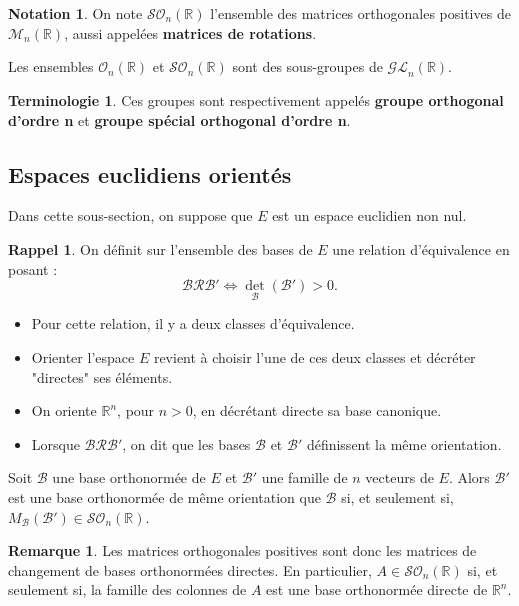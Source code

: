 \documentclass[french]{article}
\newcommand{\R}{\mathbb{R}}
\theoremstyle{plain}
\theoremstyle{definition}
\newtheorem*{rmq}{Remarque}
\newtheorem*{notation}{Notation}
\newtheorem*{rappel}{Rappel}
\newtheorem*{terminologie}{Terminologie}
\theoremstyle{remark}
\begin{document}
\begin{notation}
	On note $\mathcal{SO}_n(\R)$ l'ensemble des matrices orthogonales positives de $\mathcal{M}_n(\R)$, aussi appelées \textbf{matrices de rotations}.
\end{notation}

\begin{prop}
	Les ensembles $\mathcal{O}_n(\R)$ et $\mathcal{SO}_n(\R)$ sont des sous-groupes de $\mathcal{GL}_n(\R)$.
\end{prop}

\begin{terminologie}
	Ces groupes sont respectivement appelés \textbf{groupe orthogonal d'ordre n} et \textbf{groupe spécial orthogonal d'ordre n}.
\end{terminologie}

\subsection{Espaces euclidiens orientés}

Dans cette sous-section, on suppose que $E$ est un espace euclidien non nul.

\begin{rappel}
	On définit sur l'ensemble des bases de $E$ une relation d'équivalence en posant :
$$\mathcal{B}\mathcal{R}\mathcal{B}'\iff \det_\mathcal{B}(\mathcal{B}')>0.$$
\begin{itemize}
	\item Pour cette relation, il y a deux classes d'équivalence.
	\item Orienter l'espace $E$ revient à choisir l'une de ces deux classes et décréter "directes" ses éléments.
	\item On oriente $\R^n$, pour $n>0$, en décrétant directe sa base canonique.
	\item Lorsque $\mathcal{B}\mathcal{R}\mathcal{B}'$, on dit que les bases $\mathcal{B}$ et $\mathcal{B}'$ définissent la même orientation.
\end{itemize}
\end{rappel}

\begin{prop}
	Soit $\mathcal{B}$ une base orthonormée de $E$ et $\mathcal{B}'$ une famille de $n$ vecteurs de $E$. Alors $\mathcal{B}'$ est une base orthonormée de même orientation que $\mathcal{B}$ si, et seulement si, $M_\mathcal{B}(\mathcal{B}')\in\mathcal{SO}_n(\R)$.
\end{prop}

\begin{rmq}
	Les matrices orthogonales positives sont donc les matrices de changement de bases orthonormées directes. En particulier, $A\in\mathcal{SO}_n(\R)$ si, et seulement si, la famille des colonnes de $A$ est une base orthonormée directe de $\R^n$.
\end{rmq}
\end{document}
